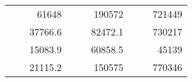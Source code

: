 \begin{table}[H]
\begin{tabular}{|ccrccrccc}
\rowcolor[HTML]{DDFDFF} 
\multicolumn{1}{|c|}{\cellcolor[HTML]{FFFFC7}}                                & \multicolumn{1}{c|}{\cellcolor[HTML]{DDFDFF}}                      & \multicolumn{1}{r|}{\cellcolor[HTML]{DAE8FC}61648}     & \multicolumn{1}{c|}{\cellcolor[HTML]{FFFFC7}}                                & \multicolumn{1}{c|}{\cellcolor[HTML]{DDFDFF}}                       & \multicolumn{1}{r|}{\cellcolor[HTML]{DDFDFF}190572}    & \multicolumn{1}{c|}{\cellcolor[HTML]{FFFFC7}}                                & \multicolumn{1}{c|}{\cellcolor[HTML]{DDFDFF}}                      & \multicolumn{1}{r|}{\cellcolor[HTML]{DDFDFF}721449}    \\ \cline{3-3} \cline{6-6} \cline{9-9} 
\multicolumn{1}{|c|}{\cellcolor[HTML]{FFFFC7}}                                & \multicolumn{1}{c|}{\cellcolor[HTML]{DDFDFF}}                      & \multicolumn{1}{r|}{\cellcolor[HTML]{DDFDFF}37766.6}   & \multicolumn{1}{c|}{\cellcolor[HTML]{FFFFC7}}                                & \multicolumn{1}{c|}{\cellcolor[HTML]{DDFDFF}}                       & \multicolumn{1}{r|}{\cellcolor[HTML]{DAE8FC}82472.1}   & \multicolumn{1}{c|}{\cellcolor[HTML]{FFFFC7}}                                & \multicolumn{1}{c|}{\cellcolor[HTML]{DDFDFF}}                      & \multicolumn{1}{r|}{\cellcolor[HTML]{DAE8FC}730217}    \\ \cline{3-3} \cline{6-6} \cline{9-9} 
\rowcolor[HTML]{DDFDFF} 
\multicolumn{1}{|c|}{\cellcolor[HTML]{FFFFC7}}                                & \multicolumn{1}{c|}{\cellcolor[HTML]{DDFDFF}}                      & \multicolumn{1}{r|}{\cellcolor[HTML]{DAE8FC}15083.9}   & \multicolumn{1}{c|}{\cellcolor[HTML]{FFFFC7}}                                & \multicolumn{1}{c|}{\cellcolor[HTML]{DDFDFF}}                       & \multicolumn{1}{r|}{\cellcolor[HTML]{DDFDFF}60858.5}   & \multicolumn{1}{c|}{\cellcolor[HTML]{FFFFC7}}                                & \multicolumn{1}{c|}{\cellcolor[HTML]{DDFDFF}}                      & \multicolumn{1}{r|}{\cellcolor[HTML]{DDFDFF}45139}     \\ \cline{3-3} \cline{6-6} \cline{9-9} 
\multicolumn{1}{|c|}{\cellcolor[HTML]{FFFFC7}}                                & \multicolumn{1}{c|}{\cellcolor[HTML]{DDFDFF}}                      & \multicolumn{1}{r|}{\cellcolor[HTML]{DDFDFF}21115.2}   & \multicolumn{1}{c|}{\cellcolor[HTML]{FFFFC7}}                                & \multicolumn{1}{c|}{\cellcolor[HTML]{DDFDFF}}                       & \multicolumn{1}{r|}{\cellcolor[HTML]{DAE8FC}150575}    & \multicolumn{1}{c|}{\cellcolor[HTML]{FFFFC7}}                                & \multicolumn{1}{c|}{\cellcolor[HTML]{DDFDFF}}                      & \multicolumn{1}{r|}{\cellcolor[HTML]{DAE8FC}770346}    \\ \cline{3-3} \cline{6-6} \cline{9-9} 

\end{tabular}
\end{table}
